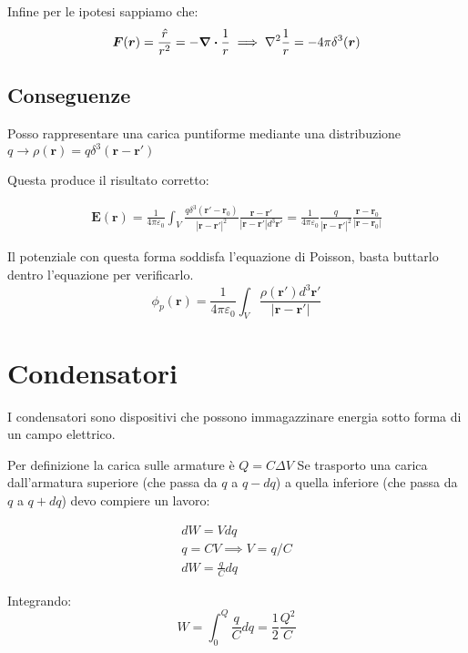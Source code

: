\documentclass[a4paper]{scrarticle}
\begin{document}
Infine per le ipotesi sappiamo che:
\begin{equation*}
    \bm F (\bm r) = \frac{\hat r}{r^2} = - \div \frac{1}{r} \implies \laplacian \frac{1}{r} = - 4 \pi \delta ^3 (\bm r)
\end{equation*}

\subsection{Conseguenze}

Posso rappresentare una carica puntiforme mediante una distribuzione $q \to \rho(\bm r) = q\delta^3(\bm r - \bm r')$

Questa produce il risultato corretto:

\begin{gather*}
    \bm E (\bm r) = \frac{1}{4\pi\varepsilon_0}\int_{V} \frac{q \delta^3 (\bm r' - \bm r_0)}{\left|\bm r - \bm r'\right|^2}\frac{\bm r - \bm r'}{\left| \bm r - \bm r '\right| d^3 \bm r'} = \frac{1}{4 \pi \varepsilon_0} \frac{q}{\left|\bm r - \bm r'\right|^2} \frac{\bm r - \bm r_0}{\left|\bm r - \bm r_0\right|}
\end{gather*}

Il potenziale con questa forma soddisfa l'equazione di Poisson, basta buttarlo dentro l'equazione per verificarlo.
\begin{equation}
    \phi_p(\bm r) = \frac{1}{4\pi\varepsilon_0}\int_{V}\frac{\rho(\bm r') d^3\bm r'}{\left|\bm r - \bm r'\right|}
\end{equation}

\section{Condensatori}

I condensatori sono dispositivi che possono immagazzinare energia sotto forma di un campo elettrico.

Per definizione la carica sulle armature è $Q = C \Delta V $
Se trasporto una carica dall'armatura superiore (che passa da $q$ a $q - dq$) a quella inferiore (che passa da $q$ a $q + dq$) devo compiere un lavoro:

\begin{gather*}
    dW = V dq\\
    q = CV\implies V = q/C \\
    dW = \frac{q}{C} dq    
\end{gather*}

Integrando:
\begin{equation}
    W = \int_{0}^{Q} \frac{q}{C} dq = \frac{1}{2}\frac{Q^2}{C}
\end{equation}
\end{document}
